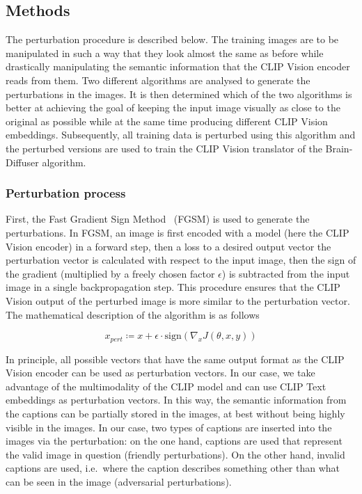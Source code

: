\subsection{Methods}

The perturbation procedure is described below. The training images are to be manipulated in such a way that they look almost the same as before while drastically manipulating the semantic information that the CLIP Vision encoder reads from them. Two different algorithms are analysed to generate the perturbations in the images. It is then determined which of the two algorithms is better at achieving the goal of keeping the input image visually as close to the original as possible while at the same time producing different CLIP Vision embeddings. Subsequently, all training data is perturbed using this algorithm and the perturbed versions are used to train the CLIP Vision translator of the Brain-Diffuser algorithm.

\subsubsection{Perturbation process}

First, the Fast Gradient Sign Method~\cite{goodfellowExplainingHarnessingAdversarial2014} (FGSM) is used to generate the perturbations. In FGSM, an image is first encoded with a model (here the CLIP Vision encoder) in a forward step, then a loss to a desired output vector the perturbation vector is calculated with respect to the input image, then the sign of the gradient (multiplied by a freely chosen factor $\epsilon$) is subtracted from the input image in a single backpropagation step. This procedure ensures that the CLIP Vision output of the perturbed image is more similar to the perturbation vector. The mathematical description of the algorithm is as follows

\[
x_{pert} \coloneq x + \epsilon \cdot \text{sign}(\nabla_x J(\theta, x, y))
\]

\noindent{}

In principle, all possible vectors that have the same output format as the CLIP Vision encoder can be used as perturbation vectors. In our case, we take advantage of the multimodality of the CLIP model and can use CLIP Text embeddings as perturbation vectors. In this way, the semantic information from the captions can be partially stored in the images, at best without being highly visible in the images. In our case, two types of captions are inserted into the images via the perturbation: on the one hand, captions are used that represent the valid image in question (friendly perturbations). On the other hand, invalid captions are used, i.e.\ where the caption describes something other than what can be seen in the image (adversarial perturbations). 

